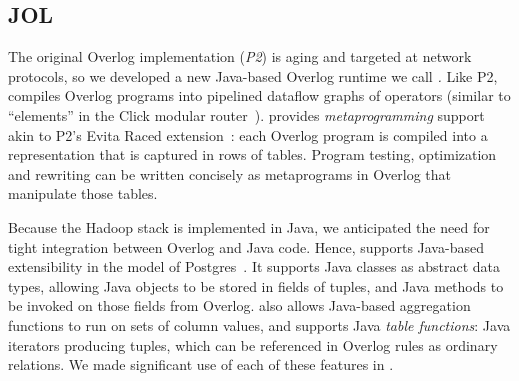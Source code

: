 \subsection{JOL}
The original Overlog implementation (\emph{P2}) is aging and targeted at network
protocols, so we developed a new Java-based Overlog runtime we call \emph{\JOL.}
Like P2, \JOL compiles Overlog programs into pipelined dataflow graphs of
operators (similar to ``elements'' in the Click modular router~\cite{click}).
\JOL provides \emph{metaprogramming} support akin to P2's Evita Raced
extension~\cite{evitaraced}: each Overlog program is compiled into a
representation that is captured in rows of tables.  Program testing,
optimization and rewriting can be written concisely as metaprograms in Overlog
that manipulate those tables.

Because the Hadoop stack is implemented in Java, we anticipated the need for
tight integration between Overlog and Java code. Hence, \JOL supports Java-based
extensibility in the model of Postgres~\cite{postgres}.  It supports Java
classes as abstract data types, allowing Java objects to be stored in fields of
tuples, and Java methods to be invoked on those fields from Overlog.  \JOL also
allows Java-based aggregation functions to run on sets of column values, and
supports Java \emph{table functions}: Java iterators producing tuples, which can
be referenced in Overlog rules as ordinary relations. We made significant use of
each of these features in \BOOMA.



